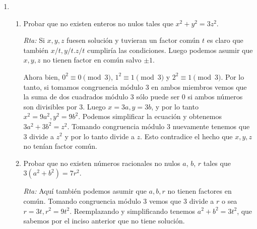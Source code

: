 \documentclass[a4paper,12pt,twoside,spanish,reqno]{amsbook}
\numberwithin{equation}{section}
\newcommand{\rta}{\noindent\textit{Rta: }}
\begin{document}
\begin{enumerate}
    
    
    
    
    
    
    
    
    
    \item \begin{enumerate}
        \item Probar que no existen enteros no nulos tales que $x^2 + y^2 = 3z^2$.
            
        \rta Si $x, y, z$ fuesen solución y tuvieran un factor común $t$ es claro que también $x/t, y/t. z/t$ cumpliría las condiciones. Luego podemos asumir que $x, y, z$ no tienen factor en común salvo $\pm1$.
        
        Ahora bien, $0^2 \equiv 0\pmod{3}$, $1^2 \equiv 1\pmod{3}$ y $2^2 \equiv 1\pmod{3}$. Por lo tanto, si tomamos congruencia módulo 3 en ambos miembros vemos que la suma de dos cuadrados módulo 3 sólo puede ser 0 si ambos números son divisibles por 3. Luego $x=3a, y=3b$, y por lo tanto $x^2=9a^2, y^2=9b^2$. Podemos simplificar la ecuación y obtenemos $3a^2+3b^2=z^2$. Tomando congruencia módulo 3 nuevamente tenemos que 3 divide a $z^2$ y por lo tanto divide a $z$. Esto contradice el hecho que $x,y, z$ no tenían factor común. 
        
        \item Probar que no existen números racionales no nulos $a$, $b$, $r$ tales que $3(a^2 + b^2) = 7r^2$.
            
        \rta Aquí también podemos asumir que $a, b, r$ no tienen factores en común. Tomando congruencia módulo 3 vemos que 3 divide a $r$ o sea $r=3t, r^2=9t^2$. Reemplazando y simplificando tenemos $a^2+b^2=3t^2$, que sabemos por el inciso anterior que no tiene solución.
        
        
    \end{enumerate}
    

\end{enumerate}
\end{document}
